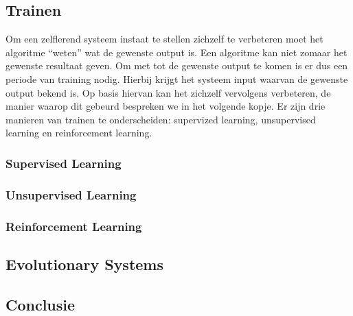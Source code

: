 \documentclass[a4paper]{article}
\begin{document}
\subsection{Trainen}
Om een zelflerend systeem instaat te stellen zichzelf te verbeteren moet het algoritme “weten” wat de gewenste output is. Een algoritme kan niet zomaar het gewenste resultaat geven. Om met tot de gewenste output te komen is er dus een periode van training nodig. Hierbij krijgt het systeem input waarvan de gewenste output bekend is. Op basis hiervan kan het zichzelf vervolgens verbeteren, de manier waarop dit gebeurd bespreken we in het volgende kopje. Er zijn drie manieren van trainen te onderscheiden: supervized learning, unsupervised learning en reinforcement learning. 

\subsubsection{Supervised Learning}

\subsubsection{Unsupervised Learning}

\subsubsection{Reinforcement Learning}





\subsection{Evolutionary Systems}

\subsection{Conclusie}




\end{document}
